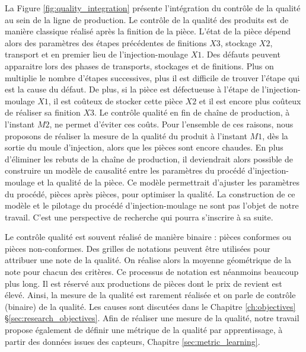 La Figure \ref{fig:quality_integration} présente l'intégration du contrôle de la qualité au sein de la ligne de production.
Le contrôle de la qualité des produits est de manière classique réalisé après la finition de la pièce.
L'état de la pièce dépend alors des paramètres des étapes précédentes de finitions $X3$, stockage $X2$, transport et en premier lieu de l'injection-moulage $X1$.
Des défauts peuvent apparaitre lors des phases de transports, stockages et de finitions.
Plus on multiplie le nombre d'étapes successives, plus il est difficile de trouver l'étape qui est la cause du défaut.
De plus, si la pièce est défectueuse à l'étape de l'injection-moulage $X1$, il est coûteux de stocker cette pièce $X2$ et il est encore plus coûteux de réaliser sa finition $X3$.
Le contrôle qualité en fin de chaîne de production, à l'instant $M2$, ne permet d'éviter ces coûts.
Pour l'ensemble de ces raisons, nous proposons de réaliser la mesure de la qualité du produit à l'instant $M1$, dès la sortie du moule d'injection, alors que les pièces sont encore chaudes.
En plus d'éliminer les rebuts de la chaîne de production, il deviendrait alors possible de construire un modèle de causalité entre les paramètres du procédé d'injection-moulage et la qualité de la pièce.
Ce modèle permettrait d'ajuster les paramètres du procédé, pièces après pièces, pour optimiser la qualité.
La construction de ce modèle et le pilotage du procédé d'injection-moulage ne sont pas l'objet de notre travail.
C'est une perspective de recherche qui pourra s'inscrire à sa suite.

Le contrôle qualité est souvent réalisé de manière binaire : pièces conformes ou pièces non-conformes.
Des grilles de notations peuvent être utilisées pour attribuer une note de la qualité.
On réalise alors la moyenne géométrique de la note pour chacun des critères.
Ce processus de notation est néanmoins beaucoup plus long.
Il est réservé aux productions de pièces dont le prix de revient est élevé.
Ainsi, la mesure de la qualité est rarement réalisée et on parle de contrôle (binaire) de la qualité.
Les causes sont discutées dans le Chapitre \ref{ch:objectives} §\ref{sec:research_objectives}.
Afin de réaliser une mesure de la qualité, notre travail propose également de définir une métrique de la qualité par apprentissage, à partir des données issues des capteurs, Chapitre \ref{sec:metric_learning}.


